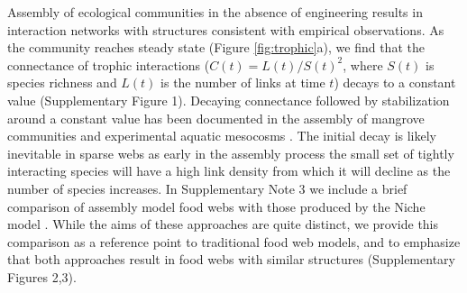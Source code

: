 \documentclass[twocolumn,preprintnumbers,amsmath,amssymb,superscriptaddress,linenumbers]{revtex4-1}
\begin{document}
Assembly of ecological communities in the absence of engineering results in interaction networks with structures consistent with empirical observations.
As the community reaches steady state (Figure \ref{fig:trophic}a), we find that the connectance of trophic interactions ($C(t)=L(t)/S(t)^2$, where $S(t)$ is species richness and $L(t)$ is the number of links at time $t$) decays to a constant value (Supplementary Figure 1). %
Decaying connectance followed by stabilization around a constant value has been documented in the assembly of mangrove communities \cite{Piechnik2008} and experimental aquatic mesocosms \cite{Fahimipour2014}. 
The initial decay is likely inevitable in sparse webs as early in the assembly process the small set of tightly interacting species will have a high link density from which it will decline as the number of species increases.
In Supplementary Note 3 we include a brief comparison of assembly model food webs with those produced by the Niche model \cite{Williams2000}.
While the aims of these approaches are quite distinct, we provide this comparison as a reference point to traditional food web models, and to emphasize that both approaches result in food webs with similar structures (Supplementary Figures 2,3).
\end{document}
